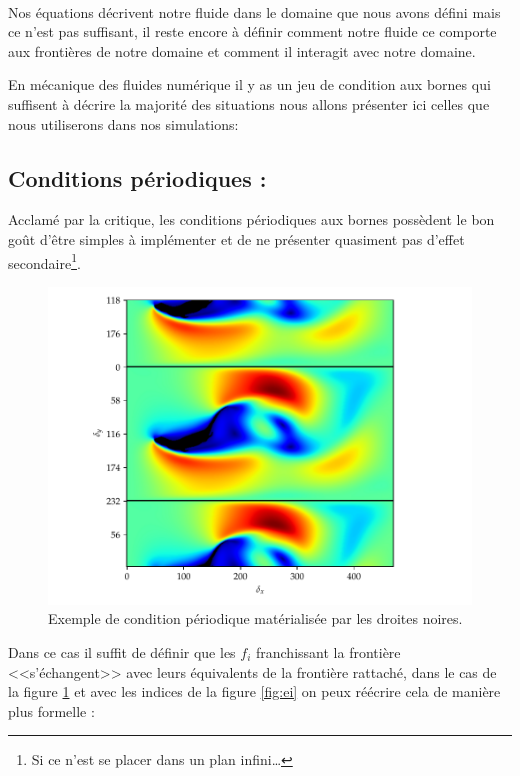 \paragraph*{}
  Nos équations décrivent notre fluide dans le domaine que nous avons défini mais ce n'est pas suffisant, il reste encore
  à définir comment notre fluide ce comporte aux frontières de notre domaine et comment il interagit avec notre domaine.
  
  En mécanique des fluides numérique il y as un jeu de condition aux bornes qui suffisent à décrire la majorité des   
  situations nous allons présenter ici celles que nous utiliserons dans nos simulations:
  
  \subsection{\bf Conditions périodiques :}
    Acclamé par la critique, les conditions périodiques aux bornes possèdent le bon goût d'être simples à implémenter et
    de ne présenter quasiment pas d'effet secondaire\footnote{Si ce n'est se placer dans un plan infini\dots}.
    
    \begin{figure}[hbtp]
      \centering
      \includegraphics[width=\linewidth]{periodic.pdf}
      \caption{Exemple de condition périodique matérialisée par les droites noires.}
      \label{fig:per}
    \end{figure}
  
    Dans ce cas il suffit de définir que les $f_i$ franchissant la frontière <<s'échangent>> avec leurs équivalents de
    la frontière rattaché, dans le cas de la figure \ref{fig:per} et avec les indices de la figure \ref{fig:ei} on peux     
    réécrire cela de manière plus formelle :
    
